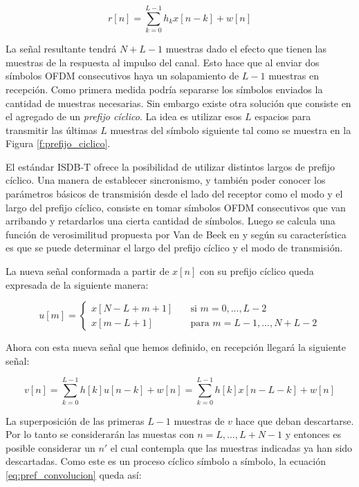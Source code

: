 \begin{equation}
r[n] = \sum_{k = 0}^{L-1} h_k x[n-k] + w[n]
\end{equation}

La señal resultante tendrá $N+L-1$ muestras dado el efecto que tienen las muestras de la respuesta al impulso del canal. Esto hace que al enviar dos símbolos OFDM consecutivos haya un solapamiento de $L-1$ muestras en recepción. Como primera medida podría separarse los símbolos enviados la cantidad de muestras necesarias. Sin embargo existe otra solución que consiste en el agregado de un \textit{prefijo cíclico}. La idea es utilizar esos $L$ espacios para transmitir las últimas $L$ muestras del símbolo siguiente tal como se muestra en la Figura \ref{f:prefijo_ciclico}.



El estándar ISDB-T ofrece la posibilidad de utilizar distintos largos de prefijo cíclico. Una manera de establecer sincronismo, y también poder conocer los parámetros básicos de transmisión desde el lado del receptor como el modo y el largo del prefijo cíclico, consiste en tomar símbolos OFDM consecutivos que van arribando y retardarlos una cierta cantidad de símbolos. Luego se calcula una función de verosimilitud propuesta por Van de Beek en \cite{van1997ml} y según su característica es que se puede determinar el largo del prefijo cíclico y el modo de transmisión.  

La nueva señal conformada a partir de $x[n]$ con su prefijo cíclico queda expresada de la siguiente manera:

\begin{equation}
 u[m] =
  \begin{cases}
    x[N-L+m+1]       & \quad \text{si } m = 0,..., L-2\\
    x[m-L+1]  & \quad \text{para } m = L-1,..., N+L-2
  \end{cases}
\end{equation}

Ahora con esta nueva señal que hemos definido, en recepción llegará la siguiente señal:

\begin{equation}\label{eq:pref_convolucion}
v[n] = \sum_{k = 0}^{L-1}h[k]u[n-k] + w[n] = \sum_{k = 0}^{L-1}h[k]x[n-L-k] + w[n]
\end{equation}

La superposición de las primeras $L-1$ muestras de $v$ hace que deban descartarse. Por lo tanto se considerarán las muestas con $n = L,..., L+N-1$ y entonces es posible considerar un $n'$ el cual contempla que las muestras indicadas ya han sido descartadas. Como este es un proceso cíclico símbolo a símbolo, la ecuación \ref{eq:pref_convolucion} queda así: 

